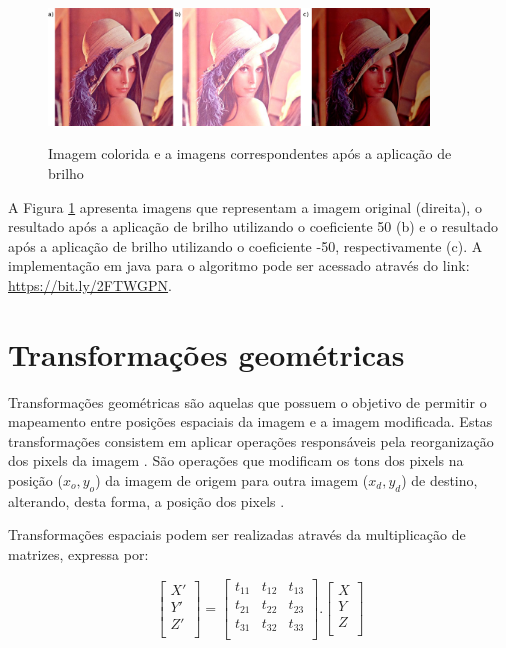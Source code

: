\documentclass[
	12pt,				%
	oneside,			%
	a4paper,			%
	english,			%
	french,				%
	spanish,			%
	brazil,				%
	]{abntex2}
\begin{document}
\begin{figure}[ht]
\centering
\caption{Imagem colorida e a imagens correspondentes após a aplicação de brilho}
\includegraphics[width=0.9\textwidth]{imagens/brilho.png}
\sourceAuthor
\label{fig:brilho}
\end{figure}

A Figura \ref{fig:brilho} apresenta imagens que representam a imagem original (direita), o resultado após a aplicação de brilho utilizando o coeficiente 50 (b) e o resultado após a aplicação de brilho utilizando o coeficiente -50, respectivamente (c). A implementação em java para o algoritmo pode ser acessado através do link: \url{https://bit.ly/2FTWGPN}.

\section{Transformações geométricas}
\label{sec:transformacoesGeometricas}

Transformações geométricas são aquelas que possuem o objetivo de permitir o mapeamento entre posições espaciais da imagem e a imagem modificada. Estas transformações consistem em aplicar operações responsáveis pela reorganização dos pixels da imagem \cite{pedriniSchwartz:2008}. São operações que modificam os tons dos pixels na posição (\(x_o, y_o\)) da imagem de origem para outra imagem (\(x_d, y_d\)) de destino, alterando, desta forma, a posição dos pixels \cite{conciAzevedoLeta:2008}.

Transformações espaciais podem ser realizadas através da multiplicação de matrizes, expressa por:

\[
\begin{bmatrix}
    X'       \\ 
	Y'       \\ 
	Z'       \\ 
\end{bmatrix}
=
\begin{bmatrix}
    t_{11} & t_{12} & t_{13}  \\ 
	t_{21} & t_{22} & t_{23}  \\ 
	t_{31} & t_{32} & t_{33}  \\ 
\end{bmatrix}
.
\begin{bmatrix}
    X       \\ 
	Y       \\ 
	Z       \\ 
\end{bmatrix}
\]
\end{document}
